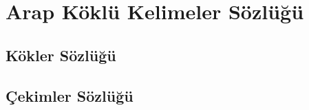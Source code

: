
\chapter{Arap Köklü Kelimeler Sözlüğü}
\noindent
\setlength{\parindent}{0pt}


\newpage

\recalctypearea
{}

\section{Kökler Sözlüğü}




\newpage
\section{Çekimler Sözlüğü}




\restoregeometry
\recalctypearea


